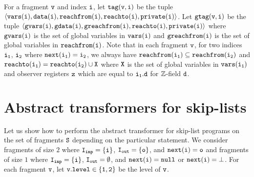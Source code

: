 
For a fragment $\tt v$ and index $\tt i$, let $\tt tag(v,i)$ be the tuple $\tt \left\langle\tt vars(i), data(i),{\tt reachfrom}(\tt i), {\tt reachto}(\tt i), private(i )\right\rangle$. Let $\tt gtag(v,i)$ be the tuple $\tt \left\langle\tt gvars(i), gdata(i),{\tt greachfrom}(\tt i), {\tt reachto}(\tt i), private(i )\right\rangle$ where $\tt gvars(i)$ is the set of global variables in $\tt vars(i)$ and $\tt greachfrom(i)$ is the set of global variables in $\tt reachfrom(i)$. Note that in each fragment $\tt v$, for two indices $\tt i_1$, $\tt i_2$ where $\tt next(i_1) = i_2$, we always have $\tt {\tt reachfrom}(\tt i_1) \subseteq \tt {\tt reachfrom}(\tt i_2)$ and $\tt {\tt reachto}(\tt i_1) = \tt {\tt reachto}(\tt i_2) \cup X$ where $\tt X$ is the set of global variables in ${\tt vars}(\tt i_1)$ and observer registers $\tt z$ which are equal to $\tt i_1.d$ for ${\mathbb Z}$-field $\tt d$. 


\section{Abstract transformers for skip-lists}
Let us show how to perform the abstract transformer for skip-list programs on the set of fragments $\tt S$ depending on the particular statement.  We consider fragments of size $2$ where $\tt I_{inp} = \{i\}$, $\tt I_{out} = \{{o}\}$, and $\tt next(i) = {o}$ and fragments of size $1$ where $\tt I_{inp} = \{i\}$, $\tt I_{out} = \emptyset$, and $\tt next(i) = null$ or $\tt next(i) = \bot$. For each fragment $\tt v$, let $\tt v.level \in \{1,2\}$ be the level of $\tt v$.

